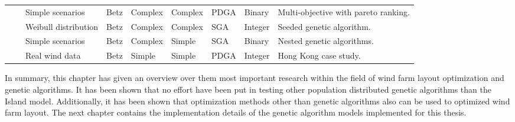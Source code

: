 \begin{sidewaystable}
\begin{center}
\begin{tabular}{l | l | l | l | l | l | l | l | l }
\cite{Sisbot}                  & \cite{Jensen}    & Simple scenarios      & Betz \citep{Albring}                & Complex     & Complex    & PDGA   & Binary   & Multi-objective with pareto ranking. \\
\cite{Saavedra-Morena} & \cite{Jensen}    & Weibull distribution  & Betz \citep{Albring}                & Complex     & Complex   & SGA    & Integer  & Seeded genetic algorithm. \\
\cite{Chen}                    & \cite{Frandsen} & Simple scenarios      & Betz \citep{Albring}                & Complex     & Simple       & SGA    & Binary   & Nested genetic algorithms. \\
\cite{Gao}                      & \cite{Jensen}    & Real wind data         & Betz \citep{Albring}                & Simple        & Simple       & PDGA   & Integer  & Hong Kong case study.
\end{tabular} 
\end{center}
\end{sidewaystable}


\noindent In summary, this chapter has given an overview over them most important research within the field of wind farm layout optimization and genetic algorithms. It has been shown that no effort have been put in testing other population distributed genetic algorithms than the Island model. Additionally, it has been shown that optimization methods other than genetic algorithms also can be used to optimized wind farm layout. The next chapter contains the implementation details of the genetic algorithm models implemented for this thesis. 

